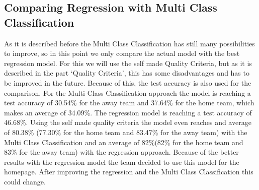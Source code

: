 \subsection{Comparing Regression with Multi Class Classification}
As it is described before the Multi Class Classification has still many possibilities to improve, so in this point we only compare the actual model with the best regression model. For this we will use the self made Quality Criteria, but as it is described in the part `Quality Criteria', this has some disadvantages and has to be improved in the future. Because of this, the test accuracy is also used for the comparison. For the Multi Class Classification approach the model is reaching a test accuracy of 30.54\% for the away team and 37.64\% for the home team, which makes an average of 34.09\%. The regression model is reaching a test accuracy of 46.68\%. Using the self made quality criteria the model even reaches and average of  80.38\% (77.30\% for the home team and 83.47\% for the away team) with the Multi Class Classification and an average of 82\%(82\% for the home team and 83\% for the away team) with the regression approach. Because of the better results with the regression model the team decided to use this model for the homepage. After improving the regression and the Multi Class Classification this could change. 